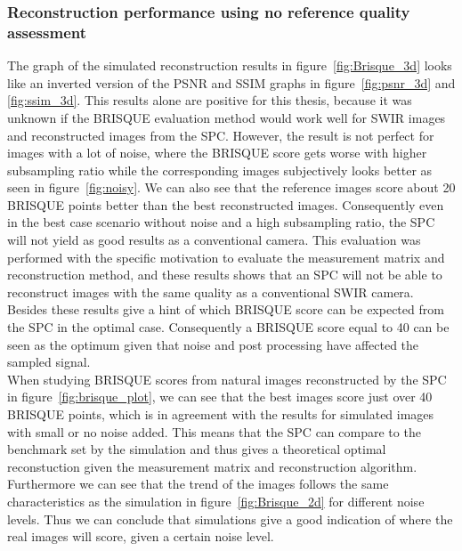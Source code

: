 \subsubsection{Reconstruction performance using no reference quality assessment}
The graph of the simulated reconstruction results in figure~\ref{fig:Brisque_3d} looks like an inverted version of the PSNR and SSIM graphs in figure~\ref{fig:psnr_3d} and \ref{fig:ssim_3d}. This results alone are positive for this thesis, because it was unknown if the BRISQUE evaluation method would work well for SWIR images and  reconstructed images from the SPC. However, the result is not perfect for images with a lot of noise, where the BRISQUE score gets worse with higher subsampling ratio while the corresponding images subjectively looks better as seen in figure~\ref{fig:noisy}. We can also see that the reference images score about 20 BRISQUE points better than the best reconstructed images. Consequently even in the best case scenario without noise and a high subsampling ratio, the SPC will not yield as good results as a conventional camera. This evaluation was performed with the specific motivation to evaluate the measurement matrix and reconstruction method, and these results shows that an SPC will not be able to reconstruct images with the same quality as a conventional SWIR camera. Besides these results give a hint of which BRISQUE score can be expected from the SPC in the optimal case. Consequently a BRISQUE score equal to 40 can be seen as the optimum given that noise and post processing have affected the sampled signal.\\[0.1in]


When studying BRISQUE scores from natural images reconstructed by the SPC in figure~\ref{fig:brisque_plot}, we can see that the best images score just over 40 BRISQUE points, which is in agreement with the results for simulated images with small or no noise added. This means that the SPC can compare to the benchmark set by the simulation and thus gives a theoretical optimal reconstuction given the measurement matrix and reconstruction algorithm. Furthermore we can see that the trend of the images follows the same characteristics as the simulation in figure~\ref{fig:Brisque_2d} for different noise levels. Thus we can conclude that simulations give a good indication of where the real images will score, given a certain noise level.\\[0.1in]

